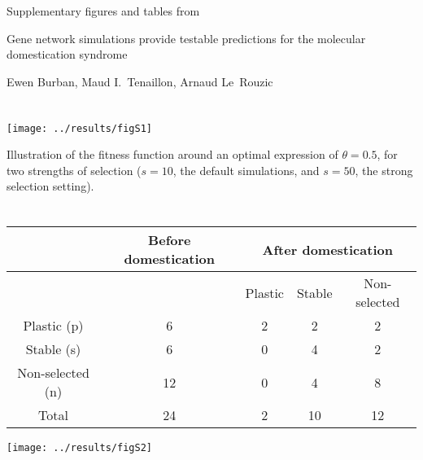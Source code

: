 \documentclass[10pt,a4paper]{article}
\begin{document}
\begin{center}
\vspace{2cm}


{\Huge\textsc Supplementary figures and tables from}

\vspace{1cm}

{\LARGE Gene network simulations provide testable predictions for the molecular domestication syndrome}

\vspace{1cm}

{\LARGE Ewen Burban, Maud I.\ Tenaillon, Arnaud Le~Rouzic}

\end{center}

\vspace{3cm}

\section{}

\begin{center}
\texttt{[image: ../results/figS1]}
\end{center}

Illustration of the fitness function around an optimal expression of $\theta=0.5$, for two strengths of selection ($s=10$, the default simulations, and $s=50$, the strong selection setting).  

\clearpage

\section{}

\vspace{2cm}

\begin{center}
\begin{tabular}{ccccc}
 & Before domestication & \multicolumn{3}{c}{After domestication} \\ \hline
 & & Plastic & Stable & Non-selected \\ \hline
 Plastic (p) & 6 & 2 & 2 & 2 \\
 Stable (s)  & 6 & 0 & 4 & 2 \\
 Non-selected (n) & 12 & 0 & 4 & 8 \\ \hline
 Total            & 24 & 2 & 10 & 12 
\end{tabular}

\vspace{2cm}

\texttt{[image: ../results/figS2]}
\end{center}
\end{document}
